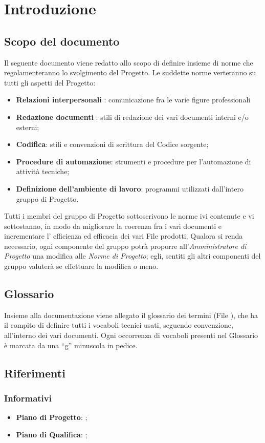 \section{Introduzione}{
	\subsection{Scopo del documento}{
		Il seguente documento viene redatto allo scopo di definire insieme di norme che regolamenteranno lo svolgimento del Progetto. Le suddette norme verteranno su tutti gli aspetti del Progetto:
		\begin{itemize}
        \item \textbf{Relazioni interpersonali} : comunicazione fra le varie figure professionali \item \textbf{Redazione documenti} : stili di redazione dei vari documenti interni e/o	esterni;
		\item \textbf{Codifica}: stili e convenzioni di scrittura del Codice sorgente;
		\item \textbf{Procedure di automazione}: strumenti e procedure per l’automazione di attività tecniche;
		\item \textbf{Definizione dell’ambiente di lavoro}: programmi utilizzati dall’intero gruppo di Progetto.
		\end{itemize}
		Tutti i membri del gruppo di Progetto sottoscrivono le norme ivi contenute e vi	sottostanno, in modo da migliorare la coerenza fra i vari documenti e incrementare l' efficienza ed efficacia dei vari File prodotti.	Qualora si renda necessario, ogni componente del gruppo potrà proporre all’\emph{Amministratore di Progetto} una modifica alle \emph{Norme di Progetto}; egli, sentiti gli altri componenti del gruppo valuterà se effettuare la modifica o meno.
		
	 }
	\subsection{Glossario}{ 
	Insieme alla documentazione viene allegato il glossario dei termini (File \href{run:../Esterni/\fGlossario}{\fEscapeGlossario}), che ha il compito di definire tutti i vocaboli tecnici usati, seguendo convenzione, all’interno dei vari documenti.  Ogni occorrenza di vocaboli presenti nel Glossario è marcata da una “g” minuscola in pedice.	
	}
}
   \subsection{Riferimenti}
     \subsubsection{Informativi}
     \begin{itemize}
       \item \textbf{Piano di Progetto}: \href{run:../Esterni/\fPianoDiProgetto}{\fEscapePianoDiProgetto};
       \item \textbf{Piano di Qualifica}:  \href{run:../Esterni/\fPianoDiQualifica}{\fEscapePianoDiQualifica};
     \end{itemize}
        